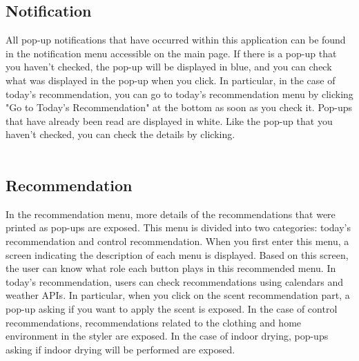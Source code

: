 \documentclass[conference]{IEEEtran}
\begin{document}
\break

\subsection{Notification}
All pop-up notifications that have occurred within this application can be found in the notification menu accessible on the main page. If there is a pop-up that you haven't checked, the pop-up will be displayed in blue, and you can check what was displayed in the pop-up when you click. In particular, in the case of today's recommendation, you can go to today's recommendation menu by clicking "Go to Today's Recommendation" at the bottom as soon as you check it. Pop-ups that have already been read are displayed in white. Like the pop-up that you haven't checked, you can check the details by clicking. \\ \\

\subsection{Recommendation}
In the recommendation menu, more details of the recommendations that were printed as pop-ups are exposed. This menu is divided into two categories: today's recommendation and control recommendation. When you first enter this menu, a screen indicating the description of each menu is displayed. Based on this screen, the user can know what role each button plays in this recommended menu. In today's recommendation, users can check recommendations using calendars and weather APIs. In particular, when you click on the scent recommendation part, a pop-up asking if you want to apply the scent is exposed. In the case of control recommendations, recommendations related to the clothing and home environment in the styler are exposed. In the case of indoor drying, pop-ups asking if indoor drying will be performed are exposed. \\ \\
\end{document}
